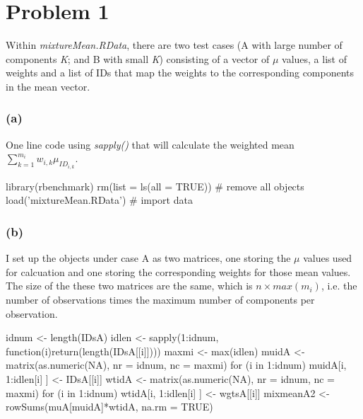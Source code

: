 \documentclass{article}
\begin{document}
\section*{Problem 1}

Within \textit{mixtureMean.RData}, there are two test cases (A with large number of components \textit{K}; 
and B with small \textit{K}) consisting of a vector of $\mu$ values, a list of weights and a list of IDs that
map the weights to the corresponding components in the mean vector.

\subsubsection*{(a)}
One line code using \textit{sapply()} that will calculate the weighted mean $\sum_{k=1}^{m_i} w_{i,k}\mu_{ID_{i,k}}$.

library(rbenchmark)
rm(list = ls(all = TRUE)) # remove all objects
load('mixtureMean.RData') # import data


\subsubsection*{(b)}
I set up the objects under case A as two matrices, one storing the $\mu$ values used for calcuation and one
storing the corresponding weights for those mean values. The size of the these two matrices are the same,
which is $n \times max(m_i)$, i.e. the number of observations times the maximum number of components per observation.

idnum <- length(IDsA)
idlen <- sapply(1:idnum, function(i){return(length(IDsA[[i]]))})
maxmi <- max(idlen)
muidA <- matrix(as.numeric(NA), nr = idnum, nc = maxmi)
for (i in 1:idnum) {
	muidA[i, 1:idlen[i] ] <- IDsA[[i]]
}
wtidA <- matrix(as.numeric(NA), nr = idnum, nc = maxmi)
for (i in 1:idnum) {
	wtidA[i, 1:idlen[i] ] <- wgtsA[[i]]
}
mixmeanA2 <- rowSums(muA[muidA]*wtidA, na.rm = TRUE)
\end{document}
